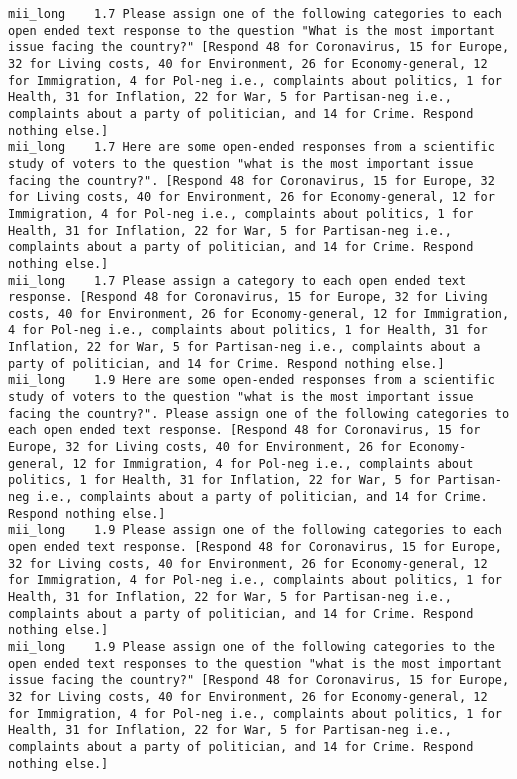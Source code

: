 \begin{lstlisting}[label=lst:promptvariants]
mii_long	1.7	Please assign one of the following categories to each open ended text response to the question "What is the most important issue facing the country?" [Respond 48 for Coronavirus, 15 for Europe, 32 for Living costs, 40 for Environment, 26 for Economy-general, 12 for Immigration, 4 for Pol-neg i.e., complaints about politics, 1 for Health, 31 for Inflation, 22 for War, 5 for Partisan-neg i.e., complaints about a party of politician, and 14 for Crime. Respond nothing else.]
mii_long	1.7	Here are some open-ended responses from a scientific study of voters to the question "what is the most important issue facing the country?". [Respond 48 for Coronavirus, 15 for Europe, 32 for Living costs, 40 for Environment, 26 for Economy-general, 12 for Immigration, 4 for Pol-neg i.e., complaints about politics, 1 for Health, 31 for Inflation, 22 for War, 5 for Partisan-neg i.e., complaints about a party of politician, and 14 for Crime. Respond nothing else.]
mii_long	1.7	Please assign a category to each open ended text response. [Respond 48 for Coronavirus, 15 for Europe, 32 for Living costs, 40 for Environment, 26 for Economy-general, 12 for Immigration, 4 for Pol-neg i.e., complaints about politics, 1 for Health, 31 for Inflation, 22 for War, 5 for Partisan-neg i.e., complaints about a party of politician, and 14 for Crime. Respond nothing else.]
mii_long	1.9	Here are some open-ended responses from a scientific study of voters to the question "what is the most important issue facing the country?". Please assign one of the following categories to each open ended text response. [Respond 48 for Coronavirus, 15 for Europe, 32 for Living costs, 40 for Environment, 26 for Economy-general, 12 for Immigration, 4 for Pol-neg i.e., complaints about politics, 1 for Health, 31 for Inflation, 22 for War, 5 for Partisan-neg i.e., complaints about a party of politician, and 14 for Crime. Respond nothing else.]
mii_long	1.9	Please assign one of the following categories to each open ended text response. [Respond 48 for Coronavirus, 15 for Europe, 32 for Living costs, 40 for Environment, 26 for Economy-general, 12 for Immigration, 4 for Pol-neg i.e., complaints about politics, 1 for Health, 31 for Inflation, 22 for War, 5 for Partisan-neg i.e., complaints about a party of politician, and 14 for Crime. Respond nothing else.]
mii_long	1.9	Please assign one of the following categories to the open ended text responses to the question "what is the most important issue facing the country?" [Respond 48 for Coronavirus, 15 for Europe, 32 for Living costs, 40 for Environment, 26 for Economy-general, 12 for Immigration, 4 for Pol-neg i.e., complaints about politics, 1 for Health, 31 for Inflation, 22 for War, 5 for Partisan-neg i.e., complaints about a party of politician, and 14 for Crime. Respond nothing else.]

\end{lstlisting}
